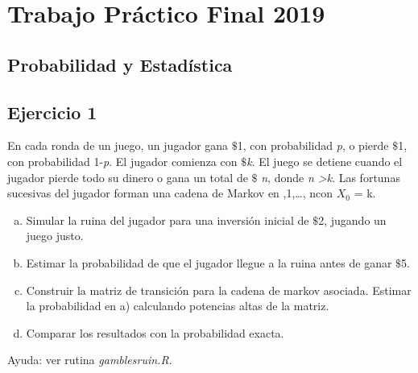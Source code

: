 \documentclass[12pt, a4paper]{article}
\begin{document}
 
\section*{Trabajo Práctico Final 2019}
\subsection*{Probabilidad y Estadística}
\subsection*{Ejercicio 1}
En cada ronda de un juego, un jugador gana $\mathdollar$1, con probabilidad \textit{p}, o pierde $\mathdollar$1, con probabilidad 1-\textit{p}. El jugador comienza con $\mathdollar$\textit{k}. El juego se detiene cuando el jugador pierde todo su dinero o gana un total de $\mathdollar$ \textit{n}, donde \textit{ n \textgreater k}. Las fortunas sucesivas del jugador forman una cadena de Markov en ,1,…, n\textbraceright  con $X_{0}$ = k.
\begin{enumerate}[(a)]
	\item Simular la ruina del jugador para una inversión inicial de $\mathdollar$2, jugando un juego justo.
	\item Estimar la probabilidad de que el jugador llegue a la ruina antes de ganar $\mathdollar$5.
	\item Construir la matriz de transición para la cadena de markov asociada. Estimar la probabilidad en a) calculando potencias altas de la matriz.
	\item Comparar los resultados con la probabilidad exacta. 
\end{enumerate}
	Ayuda: ver rutina \textit{gamblesruin.R}.
\end{document}

